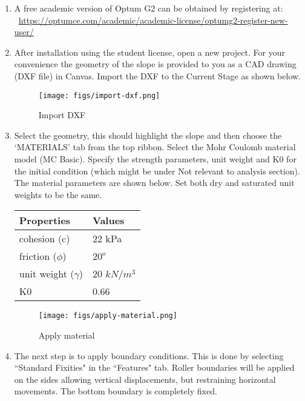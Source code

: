 \documentclass[a4paper,12pt]{article}
\begin{document}
\begin{enumerate}
	\item A free academic version of Optum G2 can be obtained by registering at: ~\url{https://optumce.com/academic/academic-license/optumg2-register-new-user/}
	
	\item After installation using the student license, open a new project. For your convenience the geometry of the slope is provided to you as a CAD drawing (DXF file) in Canvas. Import the DXF to the Current Stage as shown below.
	
	\begin{figure}[!h]
		\centering
		\texttt{[image: figs/import-dxf.png]}
		\caption{Import DXF}
	\end{figure}
	
	\item Select the geometry, this should highlight the slope and then choose the `MATERIALS' tab from the top ribbon. Select the Mohr Coulomb material model (MC Basic). Specify the strength parameters, unit weight and K0 for the initial condition (which might be under Not relevant to analysis section). The material parameters are shown below. Set both dry and saturated unit weights to be the same.

	\begin{table}[!h]
		\centering
		\begin{tabular}{ll}
			\toprule
			\textbf{Properties}     & \textbf{Values} \\
			\midrule
			cohesion (c) & 22 kPa    \\
			friction ($\phi$)   & $20^o$   \\
			unit weight ($\gamma$)   & 20 $kN/m^3$    \\
			K0             & 0.66  \\
			\bottomrule
		\end{tabular}
	\end{table}
	
	\begin{figure}[!h]
		\centering
		\texttt{[image: figs/apply-material.png]}
		\caption{Apply material}
	\end{figure}

	\item The next step is to apply boundary conditions. This is done by selecting ``Standard Fixities" in the ``Features" tab. Roller boundaries will be applied on the sides allowing vertical displacements, but restraining horizontal movements. The bottom boundary is completely fixed.
	

\end{enumerate}
\end{document}
